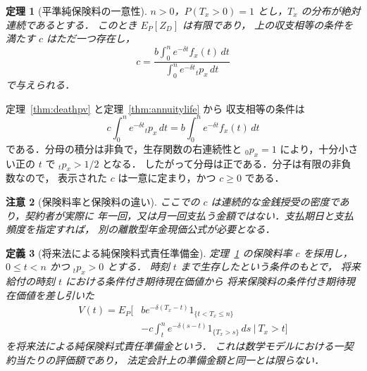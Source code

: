 \documentclass[a5paper,10pt,onecolumn]{jsarticle}
\makeatletter
\theoremstyle{mathnotetheorem}
\newtheorem{theorem}{定理}[section]
\newtheorem{definition}[theorem]{定義}
\newtheorem{remark}[theorem]{注意}
\renewcommand{\proofname}{証明}
\renewenvironment{proof}[1][\proofname]{%
  \par\pushQED{\qed}\normalfont\topsep4\p@\@plus2\p@\relax
  \trivlist\item[\hskip\labelsep\bfseries #1]\ignorespaces
}{\popQED\endtrivlist\@endpefalse}
\makeatother
\begin{document}
\begin{theorem}[平準純保険料の一意性]\label{thm:levelprem}
$n>0$，$P(T_x>0)=1$ とし，$T_x$ の分布が絶対連続であるとする．
このとき $E_P[Z_D]$ は有限であり，
上の収支相等の条件を満たす $c$ はただ一つ存在し，
\[
 c=\frac{b\int_0^n e^{-\delta t}f_x(t)\,dt}
 {\int_0^n e^{-\delta t}{}_tp_x\,dt}
\]
で与えられる．
\end{theorem}
\begin{proof}
定理~\ref{thm:deathpv} と定理~\ref{thm:annuitylife} から
収支相等の条件は
\[
 c\int_0^n e^{-\delta t}{}_tp_x\,dt
 =b\int_0^n e^{-\delta t}f_x(t)\,dt
\]
である．分母の積分は非負で，生存関数の右連続性と
${}_0p_x=1$ により，十分小さい正の $t$ で ${}_tp_x>1/2$ となる．
したがって分母は正である．分子は有限の非負数なので，
表示された $c$ は一意に定まり，かつ $c\ge0$ である．\end{proof}

\begin{remark}[保険料率と保険料の違い]
ここでの $c$ は連続的な金銭授受の密度であり，契約者が実際に
年一回，又は月一回支払う金額ではない．支払期日と支払頻度を指定すれば，
別の離散型年金現価公式が必要となる．
\end{remark}

\begin{definition}[将来法による純保険料式責任準備金]
定理~\ref{thm:levelprem} の保険料率 $c$ を採用し，
$0\le t<n$ かつ ${}_tp_x>0$ とする．
時刻 $t$ まで生存したという条件のもとで，
将来給付の時刻 $t$ における条件付き期待現在価値から
将来保険料の条件付き期待現在価値を差し引いた
\[
 \begin{split}
 V(t)=E_P\bigg[&b e^{-\delta(T_x-t)}1_{\{t<T_x\le n\}}\\
 &-c\int_t^n e^{-\delta(s-t)}1_{\{T_x>s\}}\,ds
 \ \bigg|\ T_x>t\bigg]
 \end{split}
\]
を\emph{将来法による純保険料式責任準備金}という．
これは数学モデルにおける一契約当たりの評価額であり，
法定会計上の準備金額と同一とは限らない．
\end{definition}
\end{document}
